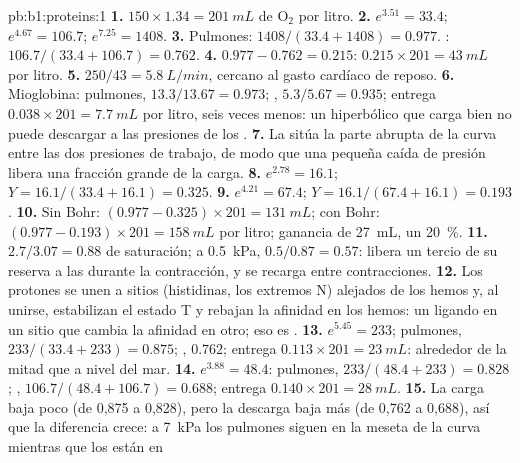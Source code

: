 \begin{solution}{pb:b1:proteins:1}
\textbf{1.} $150\times 1.34 = \qty{201}{mL}$ de $\mathrm{O_2}$ por litro.
\textbf{2.} $e^{3.51} = 33.4$; $e^{4.67} = 106.7$; $e^{7.25} = 1408$.
\textbf{3.} Pulmones: $1408/(33.4 + 1408) = 0.977$. :
$106.7/(33.4 + 106.7) = 0.762$.
\textbf{4.} $0.977 - 0.762 = 0.215$: $0.215\times 201 = \qty{43}{mL}$ por
litro.
\textbf{5.} $250/43 = \qty{5.8}{L/min}$, cercano al gasto cardíaco de
reposo.
\textbf{6.} Mioglobina: pulmones, $13.3/13.67 = 0.973$; ,
$5.3/5.67 = 0.935$; entrega $0.038\times 201 = \qty{7.7}{mL}$ por litro,
seis veces menos: un  hiperbólico que carga bien no puede
descargar a las presiones de los .
\textbf{7.} La  sitúa la parte abrupta de la curva entre las
dos presiones de trabajo, de modo que una pequeña caída de presión libera
una fracción grande de la carga.
\textbf{8.} $e^{2.78} = 16.1$; $Y = 16.1/(33.4 + 16.1) = 0.325$.
\textbf{9.} $e^{4.21} = 67.4$; $Y = 16.1/(67.4 + 16.1) = 0.193$.
\textbf{10.} Sin Bohr: $(0.977 - 0.325)\times 201 = \qty{131}{mL}$; con
Bohr: $(0.977 - 0.193)\times 201 = \qty{158}{mL}$ por litro; ganancia de
\qty{27}{mL}, un \qty{20}{\%}.
\textbf{11.} $2.7/3.07 = 0.88$ de saturación; a \qty{0.5}{kPa},
$0.5/0.87 = 0.57$: libera un tercio de su reserva a las  durante
la contracción, y se recarga entre contracciones.
\textbf{12.} Los protones se unen a sitios (histidinas, los extremos N)
alejados de los hemos y, al unirse, estabilizan el estado T y rebajan la
afinidad en los hemos: un ligando en un sitio que cambia la afinidad en
otro; eso es .
\textbf{13.} $e^{5.45} = 233$; pulmones, $233/(33.4 + 233) = 0.875$;
, $0.762$; entrega $0.113\times 201 = \qty{23}{mL}$: alrededor de la
mitad que a nivel del mar.
\textbf{14.} $e^{3.88} = 48.4$: pulmones, $233/(48.4 + 233) = 0.828$;
, $106.7/(48.4 + 106.7) = 0.688$; entrega $0.140\times 201 =
\qty{28}{mL}$.
\textbf{15.} La carga baja poco (de 0,875 a 0,828), pero la descarga baja
más (de 0,762 a 0,688), así que la diferencia crece: a \qty{7}{kPa} los
pulmones siguen en la meseta de la curva mientras que los  están en

\end{solution}
